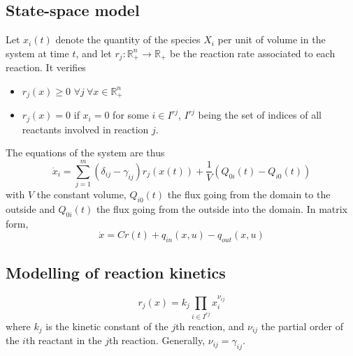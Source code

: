 \documentclass[12pt, openany]{report}
\theoremstyle{definition}
\newcommand{\R}{\mathbb{R}}
\begin{document}
\subsection{State-space model}
Let $x_i(t)$ denote the quantity of the species $X_i$ per unit of volume in the system at time $t$, and let $r_j:\R^n_+\rightarrow \R_+$ be the reaction rate associated to each reaction. It verifies 
\begin{itemize}
    \item $r_j(x)\ge 0$ $\forall j\: \forall x\in \R_+^n$
    \item $r_j(x)=0$ if $x_i=0$ for some $i\in I^{rj}$, $I^{rj}$ being the set of indices of all reactants involved in reaction $j$.
\end{itemize}
The equations of the system are thus
\begin{equation}
    \dot x_i = \sum_{j=1}^m (\delta_{ij}-\gamma_{ij})r_j(x(t))+\frac{1}{V}(Q_{0i}(t)-Q_{i0}(t))
\end{equation}
with $V$ the constant volume, $Q_{i0}(t)$ the flux going from the domain to the outside and $Q_{0i}(t)$ the flux going from the outside into the domain. In matrix form,
\begin{equation}
    \dot x= Cr(t)+q_{in}(x,u)-q_{out}(x,u)
\end{equation}
\subsection{Modelling of reaction kinetics}
\begin{equation}
    r_j(x) = k_j \prod_{i\in I^{rj}} x_i^{\nu_{ij}}
\end{equation}
where $k_j$ is the kinetic constant of the $j$th reaction, and $\nu_{ij}$ the partial order of the $i$th reactant in the $j$th reaction. Generally, $\nu_{ij}=\gamma_{ij}$. 
\end{document}
